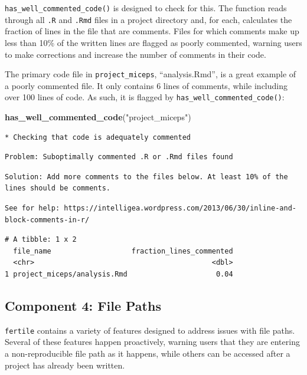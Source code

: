 \documentclass[12pt,twoside]{reedthesis}
\newenvironment{Shaded}{\begin{snugshade}}{\end{snugshade}}
\newcommand{\KeywordTok}[1]{\textcolor[rgb]{0.13,0.29,0.53}{\textbf{#1}}}
\newcommand{\NormalTok}[1]{#1}
\newcommand{\StringTok}[1]{\textcolor[rgb]{0.31,0.60,0.02}{#1}}
\begin{document}
\texttt{has\_well\_commented\_code()} is designed to check for this. The function reads through all \texttt{.R} and \texttt{.Rmd} files in a project directory and, for each, calculates the fraction of lines in the file that are comments. Files for which comments make up less than 10\% of the written lines are flagged as poorly commented, warning users to make corrections and increase the number of comments in their code.

The primary code file in \texttt{project\_miceps}, ``analysis.Rmd'', is a great example of a poorly commented file. It only contains 6 lines of comments, while including over 100 lines of code. As such, it is flagged by \texttt{has\_well\_commented\_code()}:
\begin{Shaded}
\begin{Highlighting}[]
\KeywordTok{has_well_commented_code}\NormalTok{(}\StringTok{"project_miceps"}\NormalTok{)}
\end{Highlighting}
\end{Shaded}
\begin{verbatim}
* Checking that code is adequately commented 
\end{verbatim}
\begin{verbatim}
Problem: Suboptimally commented .R or .Rmd files found 
\end{verbatim}
\begin{verbatim}
Solution: Add more comments to the files below. At least 10% of the
lines should be comments. 
\end{verbatim}
\begin{verbatim}
See for help: https://intelligea.wordpress.com/2013/06/30/inline-and-
block-comments-in-r/
\end{verbatim}
\begin{verbatim}
# A tibble: 1 x 2
  file_name                   fraction_lines_commented
  <chr>                                          <dbl>
1 project_miceps/analysis.Rmd                     0.04
\end{verbatim}
\hypertarget{component-4-file-paths}{%
\subsection{Component 4: File Paths}\label{component-4-file-paths}}

\texttt{fertile} contains a variety of features designed to address issues with file paths. Several of these features happen proactively, warning users that they are entering a non-reproducible file path as it happens, while others can be accessed after a project has already been written.
\end{document}
